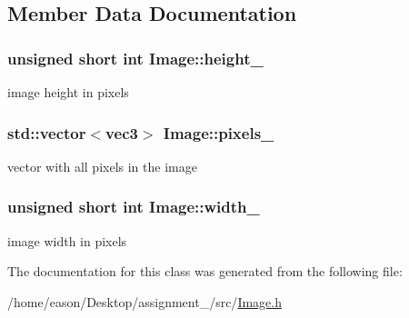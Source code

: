\subsection{Member Data Documentation}
\subsubsection[{\texorpdfstring{height\+\_\+}{height_}}]{\setlength{\rightskip}{0pt plus 5cm}unsigned short int Image\+::height\+\_\+\hspace{0.3cm}{\ttfamily [private]}}\hypertarget{classImage_a61db48547d78218ecc7b1fff35f011c2}{}\label{classImage_a61db48547d78218ecc7b1fff35f011c2}


image height in pixels 

\subsubsection[{\texorpdfstring{pixels\+\_\+}{pixels_}}]{\setlength{\rightskip}{0pt plus 5cm}std\+::vector$<${\bf vec3}$>$ Image\+::pixels\+\_\+\hspace{0.3cm}{\ttfamily [private]}}\hypertarget{classImage_af271f3879d09bcba694164048f94172c}{}\label{classImage_af271f3879d09bcba694164048f94172c}


vector with all pixels in the image 

\subsubsection[{\texorpdfstring{width\+\_\+}{width_}}]{\setlength{\rightskip}{0pt plus 5cm}unsigned short int Image\+::width\+\_\+\hspace{0.3cm}{\ttfamily [private]}}\hypertarget{classImage_a8734c4cebb55f81253f34a8474ef52e5}{}\label{classImage_a8734c4cebb55f81253f34a8474ef52e5}


image width in pixels 



The documentation for this class was generated from the following file\+:\begin{DoxyCompactItemize}
\item 
/home/eason/\+Desktop/assignment\+\_/src/\hyperlink{Image_8h}{Image.\+h}\end{DoxyCompactItemize}
